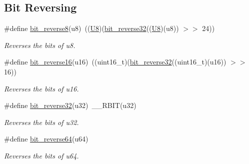 \subsection*{Bit Reversing}
\begin{DoxyCompactItemize}
\item 
\#define \mbox{\hyperlink{group__group__sam0__utils_gaef8832dcae9aaac78c5ebe91fc33084b}{bit\+\_\+reverse8}}(u8)~((\mbox{\hyperlink{group__group__sam0__utils_gaa63ef7b996d5487ce35a5a66601f3e73}{U8}})(\mbox{\hyperlink{group__group__sam0__utils_gaff755a5c107b5e28e5b846c5f122e69f}{bit\+\_\+reverse32}}((\mbox{\hyperlink{group__group__sam0__utils_gaa63ef7b996d5487ce35a5a66601f3e73}{U8}})(u8)) $>$$>$ 24))
\begin{DoxyCompactList}\small\item\em Reverses the bits of {\itshape u8}. \end{DoxyCompactList}\item 
\#define \mbox{\hyperlink{group__group__sam0__utils_gabab01124189eab03857671c05abfe377}{bit\+\_\+reverse16}}(u16)~((uint16\+\_\+t)(\mbox{\hyperlink{group__group__sam0__utils_gaff755a5c107b5e28e5b846c5f122e69f}{bit\+\_\+reverse32}}((uint16\+\_\+t)(u16)) $>$$>$ 16))
\begin{DoxyCompactList}\small\item\em Reverses the bits of {\itshape u16}. \end{DoxyCompactList}\item 
\#define \mbox{\hyperlink{group__group__sam0__utils_gaff755a5c107b5e28e5b846c5f122e69f}{bit\+\_\+reverse32}}(u32)~\+\_\+\+\_\+\+R\+B\+IT(u32)
\begin{DoxyCompactList}\small\item\em Reverses the bits of {\itshape u32}. \end{DoxyCompactList}\item 
\#define \mbox{\hyperlink{group__group__sam0__utils_ga7f3f2d786440776bab3f688cbd1e8030}{bit\+\_\+reverse64}}(u64)
\begin{DoxyCompactList}\small\item\em Reverses the bits of {\itshape u64}. \end{DoxyCompactList}\end{DoxyCompactItemize}
